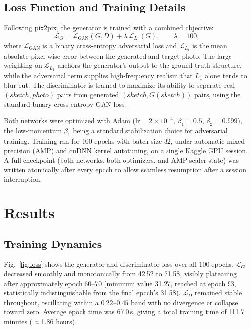 \documentclass[conference]{IEEEtran}
\begin{document}
\subsection{Loss Function and Training Details}

Following pix2pix, the generator is trained with a combined objective:
\begin{equation}
\mathcal{L}_G = \mathcal{L}_{\text{GAN}}(G,D) + \lambda \, \mathcal{L}_{L_1}(G),
\qquad \lambda = 100,
\label{eq:loss}
\end{equation}
where $\mathcal{L}_{\text{GAN}}$ is a binary cross-entropy adversarial loss and
$\mathcal{L}_{L_1}$ is the mean absolute pixel-wise error between the generated and
target photo. The large weighting on $\mathcal{L}_{L_1}$ anchors the generator's output
to the ground-truth structure, while the adversarial term supplies high-frequency
realism that $L_1$ alone tends to blur out. The discriminator is trained to maximize its
ability to separate real $(sketch, photo)$ pairs from generated
$(sketch, G(sketch))$ pairs, using the standard binary cross-entropy GAN loss.

Both networks were optimized with Adam ($\text{lr}=2\times10^{-4}$, $\beta_1=0.5$,
$\beta_2=0.999$), the low-momentum $\beta_1$ being a standard stabilization choice for
adversarial training. Training ran for 100 epochs with batch size 32, under automatic
mixed precision (AMP) and cuDNN kernel autotuning, on a single Kaggle GPU session. A
full checkpoint (both networks, both optimizers, and AMP scaler state) was written
atomically after every epoch to allow seamless resumption after a session interruption.

\section{Results}
\label{sec:results}

\subsection{Training Dynamics}

Fig.~\ref{fig:loss} shows the generator and discriminator loss over all 100 epochs.
$\mathcal{L}_G$ decreased smoothly and monotonically from 42.52 to 31.58, visibly
plateauing after approximately epoch 60--70 (minimum value 31.27, reached at epoch 93,
statistically indistinguishable from the final epoch's 31.58). $\mathcal{L}_D$ remained
stable throughout, oscillating within a $0.22$--$0.45$ band with no divergence or
collapse toward zero. Average epoch time was 67.0\,s, giving a total training time of
111.7 minutes ($\approx$1.86 hours).
\end{document}
